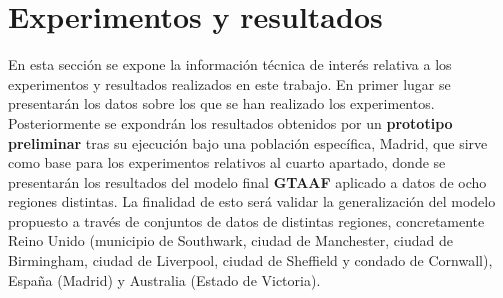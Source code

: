       
\chapter{Experimentos y resultados}

En esta sección se expone la información técnica de interés relativa a los experimentos y resultados realizados en este trabajo. En primer lugar se presentarán los datos sobre los que se han realizado los experimentos. Posteriormente se expondrán los resultados obtenidos por un \textbf{prototipo preliminar} tras su ejecución bajo una población específica, Madrid, que sirve como base para los experimentos relativos al cuarto apartado, donde se presentarán los resultados del modelo final \textbf{GTAAF} aplicado a datos de ocho regiones distintas. La finalidad de esto será validar la generalización del modelo propuesto a través de conjuntos de datos de distintas regiones, concretamente Reino Unido (municipio de Southwark, ciudad de Manchester, ciudad de Birmingham, ciudad de Liverpool, ciudad de Sheffield y condado de Cornwall), España (Madrid) y Australia (Estado de Victoria).






	

